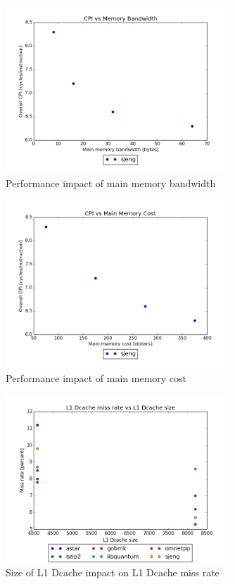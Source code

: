 \documentclass{article}
\begin{document}
\begin{figure}[ht]
    \centering
    \includegraphics[width=0.75\textwidth]{plots/CPI_vs_Bandwidth.png}
    \caption{Performance impact of main memory bandwidth}
    \label{fig:cpivsband}
\end{figure}

\begin{figure}[ht]
    \centering
    \includegraphics[width=0.75\textwidth]{plots/CPI_vs_Main_Mem_Cost.png}
    \caption{Performance impact of main memory cost}
    \label{fig:cpivsmainmemcost}
\end{figure}

\begin{figure}[ht]
    \centering
    \includegraphics[width=0.75\textwidth]{plots/L1_Dcache_miss_vs_L1_Dcache_size.png}
    \caption{Size of L1 Dcache impact on L1 Dcache miss rate}
    \label{fig:l1vsmiss}
\end{figure}
\end{document}
